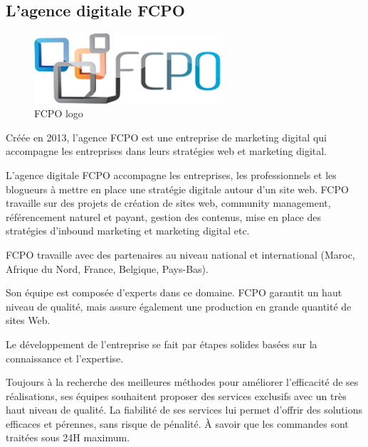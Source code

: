 \subsection{L’agence digitale FCPO}

\begin{figure}[H] 
    \centering
    \includegraphics[width=7cm]{Logos/fcpo.png}
    \caption{FCPO logo}
\end{figure}

\hspace{16pt}Créée en 2013, l'agence FCPO est une entreprise de marketing digital qui
accompagne les entreprises dans leurs stratégies web et marketing digital.

\vspace{12pt}
L’agence digitale FCPO accompagne les entreprises, les professionnels et les
blogueurs à mettre en place une stratégie digitale autour d’un site web. FCPO
travaille sur des projets de création de sites web, community management,
référencement naturel et payant, gestion des contenus, mise en place des
stratégies d’inbound marketing et marketing digital etc.

\vspace{12pt}
FCPO travaille avec des partenaires au niveau national et international
(Maroc, Afrique du Nord, France, Belgique, Pays-Bas).

\vspace{12pt}
Son équipe est composée d'experts dans ce domaine. FCPO garantit un haut
niveau de qualité, mais assure également une production en grande quantité
de sites Web.

\vspace{12pt}
Le développement de l'entreprise se fait par étapes solides basées sur la
connaissance et l'expertise.

\vspace{12pt}
Toujours à la recherche des meilleures méthodes
pour améliorer l’efficacité de ses réalisations, ses équipes souhaitent proposer
des services exclusifs avec un très haut niveau de qualité. La fiabilité de ses
services lui permet d'offrir des solutions efficaces et pérennes, sans
risque de pénalité. À savoir que les commandes sont traitées sous 24H maximum.\\ \\ \\

